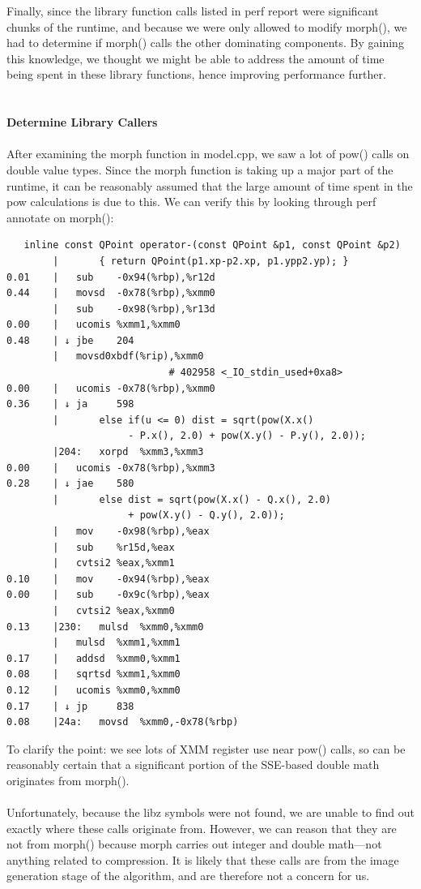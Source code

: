 \documentclass[12pt]{article}
\begin{document}
Finally, since the library function calls listed in perf report were significant chunks of the runtime, and
because we were only allowed to modify morph(), we had to determine if morph() calls the other
dominating components. By gaining this knowledge, we thought we might be able to address the amount of
time being spent in these library functions, hence improving performance further.
\\
\\
\\
{\bf Determine Library Callers}
\\
\\
After examining the morph function in model.cpp, we saw a lot of pow() calls on double value types. Since
the morph function is taking up a major part of the runtime, it can be reasonably assumed that the large
amount of time spent in the pow calculations is due to this. We can verify this by looking through perf
annotate on morph():
\newpage
\begin{lstlisting}
   inline const QPoint operator-(const QPoint &p1, const QPoint &p2) 
      	|       { return QPoint(p1.xp-p2.xp, p1.ypp2.yp); }                    
0.01 	|   sub    -0x94(%rbp),%r12d 
0.44 	|   movsd  -0x78(%rbp),%xmm0 
       	|   sub    -0x98(%rbp),%r13d 
0.00 	|   ucomis %xmm1,%xmm0 
0.48 	| ↓ jbe    204 
      	|   movsd0xbdf(%rip),%xmm0        
      	                    # 402958 <_IO_stdin_used+0xa8> 
0.00 	|   ucomis -0x78(%rbp),%xmm0 
0.36 	| ↓ ja     598 
       	|       else if(u <= 0) dist = sqrt(pow(X.x()
       	             - P.x(), 2.0) + pow(X.y() - P.y(), 2.0)); 
       	|204:   xorpd  %xmm3,%xmm3 
0.00 	|   ucomis -0x78(%rbp),%xmm3 
0.28 	| ↓ jae    580 
       	|       else dist = sqrt(pow(X.x() - Q.x(), 2.0)
       	             + pow(X.y() - Q.y(), 2.0)); 
       	|   mov    -0x98(%rbp),%eax 
       	|   sub    %r15d,%eax 
       	|   cvtsi2 %eax,%xmm1 
0.10 	|   mov    -0x94(%rbp),%eax 
0.00 	|   sub    -0x9c(%rbp),%eax 
       	|   cvtsi2 %eax,%xmm0 
0.13 	|230:   mulsd  %xmm0,%xmm0 
       	|   mulsd  %xmm1,%xmm1 
0.17 	|   addsd  %xmm0,%xmm1 
0.08 	|   sqrtsd %xmm1,%xmm0 
0.12 	|   ucomis %xmm0,%xmm0 
0.17 	| ↓ jp     838 
0.08 	|24a:   movsd  %xmm0,-0x78(%rbp)
\end{lstlisting}
To clarify the point: we see lots of XMM register use near pow() calls, so can be reasonably certain that a
significant portion of the SSE-based double math originates from morph().
\\
\\
Unfortunately, because the libz symbols were not found, we are unable to find out exactly where these calls
originate from. However, we can reason that they are not from morph() because morph carries out integer
and double math—not anything related to compression. It is likely that these calls are from the image
generation stage of the algorithm, and are therefore not a concern for us.
\newpage
\end{document}
